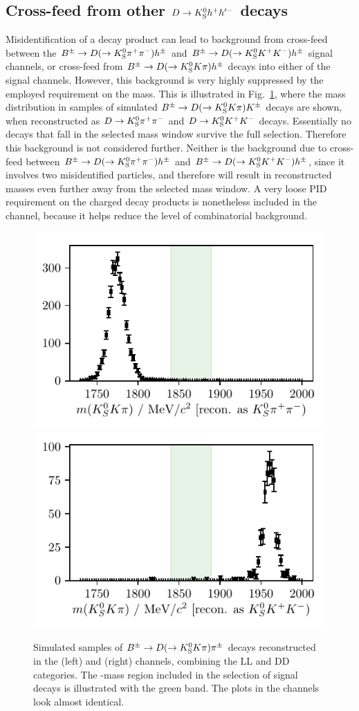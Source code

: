 \subsection{\texorpdfstring{Cross-feed from other ${D}\rightarrow{\ensuremath{{K}^0_{\mathrm{S}}}} h^+h'^-$ decays}{Cross-feed from other D->KShh' decays}} %
\label{sub:cross_feed_from_other_d_kshh_decays}

Misidentification of a \D decay product can lead to background from cross-feed between the ${{{B}^\pm}\rightarrow{\ensuremath{D}}(\rightarrow{\ensuremath{{K}^0_{\mathrm{S}}}}{\ensuremath{{\pi}^+}}{\ensuremath{{\pi}^-}})h^\pm}$ and ${{{B}^\pm}\rightarrow{\ensuremath{D}}(\rightarrow{\ensuremath{{K}^0_{\mathrm{S}}}}{\ensuremath{{K}^+}}{\ensuremath{{K}^-}})h^\pm}$ signal channels, or cross-feed from ${{{B}^\pm}\rightarrow{\ensuremath{D}}(\rightarrow{\ensuremath{{K}^0_{\mathrm{S}}}}{\ensuremath{K}}\pi)h^\pm}$ decays into either of the signal channels. However, this background is very highly suppressed by the employed requirement on the \D mass. This is illustrated in Fig.~\ref{fig:KsKpi}, where the \D mass distribution in samples of simulated ${{B}^\pm}\rightarrow{\ensuremath{D}}(\rightarrow{\ensuremath{{K}^0_{\mathrm{S}}}}{\ensuremath{K}}\pi){K}^\pm$  decays are shown, when reconstructed as ${D}\rightarrow{\ensuremath{{K}^0_{\mathrm{S}}}}{\ensuremath{{\pi}^+}}{\ensuremath{{\pi}^-}}$ and ${D}\rightarrow{\ensuremath{{K}^0_{\mathrm{S}}}}{\ensuremath{{K}^+}}{\ensuremath{{K}^-}}$ decays. Essentially no decays that fall in the selected \D mass window survive the full selection. Therefore this background is not considered further. Neither is the background due to cross-feed between ${{B}^\pm}\rightarrow{\ensuremath{D}}(\rightarrow{\ensuremath{{K}^0_{\mathrm{S}}}}{\ensuremath{{\pi}^+}}{\ensuremath{{\pi}^-}})h^\pm$ and ${{B}^\pm}\rightarrow{\ensuremath{D}}(\rightarrow{\ensuremath{{K}^0_{\mathrm{S}}}}{\ensuremath{{K}^+}}{\ensuremath{{K}^-}})h^\pm$, since it involves two misidentified particles, and therefore will result in reconstructed \D masses even further away from the selected mass window. A very loose PID requirement on the charged \D decay products is nonetheless included in the \DtoKsKK channel, because it helps reduce the level of combinatorial background.

\begin{figure}[tbp]
    \centering
    \includegraphics[width=0.45\columnwidth]{figures/analysis/background_checks/pretty_KsKpi_check_PiPi.pdf}
    \includegraphics[width=0.45\columnwidth]{figures/analysis/background_checks/pretty_KsKpi_check_KK.pdf}
    \caption{Simulated samples of ${{B}^\pm}\rightarrow{\ensuremath{D}}(\rightarrow{\ensuremath{{K}^0_{\mathrm{S}}}}{\ensuremath{K}}\pi)\pi^\pm$ decays reconstructed in the (left) \DtoKspipi and (right) \DtoKsKK channels, combining the LL and DD categories. The \D-mass region included in the selection of signal decays is illustrated with the green band. The plots in the \BtoDK channels look almost identical.}
    \label{fig:KsKpi}
\end{figure}




